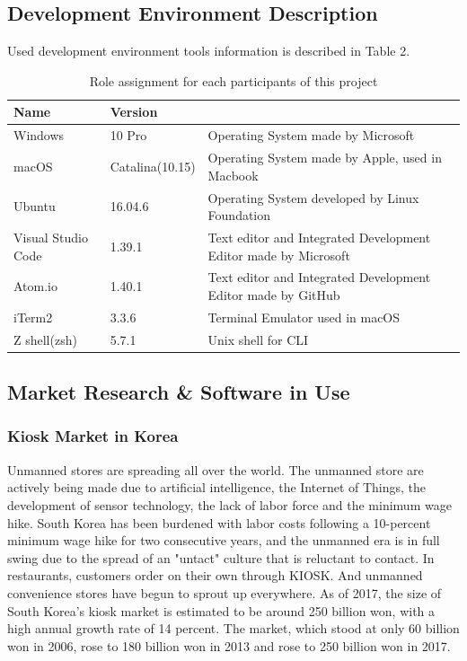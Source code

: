 \documentclass[conference,compsoc]{IEEEtran}
\begin{document}
\subsection{Development Environment Description}

Used development environment tools information is described in Table 2.

\begin{table}[ht!] \renewcommand\arraystretch{1.25}
  \begin{threeparttable}
      \caption{Role assignment for each participants of this project%
      \label{tab:table2}}    %
      \begin{tabular}{@{}l l>{\raggedright\arraybackslash}p{3.8cm}@{}}
      \toprule
      \bfseries Name & \bfseries Version & \multicolumn{1}{l}{\bfseries Description} \\
      \midrule
      Windows & 10 Pro & Operating System made by Microsoft \\
      macOS & Catalina(10.15) & Operating System made by Apple, used in Macbook \\
      Ubuntu & 16.04.6 & Operating System developed by Linux Foundation \\
      Visual Studio Code & 1.39.1 & Text editor and Integrated Development Editor made by Microsoft \\
      Atom.io & 1.40.1 & Text editor and Integrated Development Editor made by GitHub \\
      iTerm2 & 3.3.6 & Terminal Emulator used in macOS \\
      Z shell(zsh) & 5.7.1 & Unix shell for CLI \\
      \bottomrule
      \end{tabular}
  \end{threeparttable}
\end{table}

\subsection{Market Research \& Software in Use}

\subsubsection{Kiosk Market in Korea}
Unmanned stores are spreading all over the world. The unmanned store are actively being made due to artificial intelligence, the Internet of Things, the development of sensor technology, the lack of labor force and the minimum wage hike. South Korea has been burdened with labor costs following a 10-percent minimum wage hike for two consecutive years, and the unmanned era is in full swing due to the spread of an "untact" culture that is reluctant to contact. In restaurants, customers order on their own through KIOSK. And unmanned convenience stores have begun to sprout up everywhere. As of 2017, the size of South Korea's kiosk market is estimated to be around 250 billion won, with a high annual growth rate of 14 percent. The market, which stood at only 60 billion won in 2006, rose to 180 billion won in 2013 and rose to 250 billion won in 2017.
\end{document}
